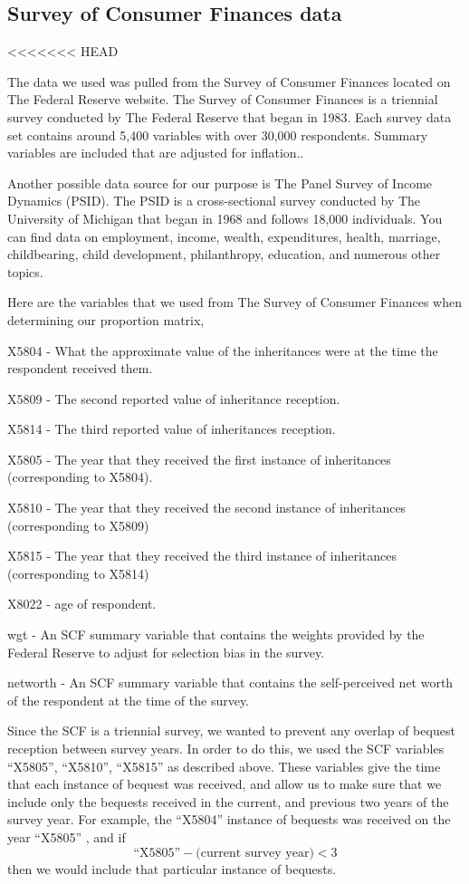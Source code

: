 \documentclass[letterpaper,12pt]{article}
\newcommand{\quotes}[1]{``#1''}
\theoremstyle{definition}
\begin{document}
\begin{spacing}{1.5}
\section{Survey of Consumer Finances data}\label{SecSCFdata}

<<<<<<< HEAD

The data we used was pulled from the Survey of Consumer Finances located on The Federal Reserve website. The Survey of Consumer Finances is a triennial survey conducted by The Federal Reserve that began in 1983. Each survey data set contains around 5,400 variables with over 30,000 respondents. Summary variables are included that are adjusted for inflation.\citet{FED}.

Another possible data source for our purpose is The Panel Survey of Income Dynamics (PSID). The PSID is a cross-sectional survey conducted by The University of Michigan that began in 1968 and follows 18,000 individuals. You can find data on employment, income, wealth, expenditures, health, marriage, childbearing, child development, philanthropy, education, and numerous other topics. \citet{UMich}

Here are the variables that we used from The Survey of Consumer Finances when determining our proportion matrix,

X5804 - What the approximate value of the inheritances were at the time the respondent received them. 

X5809 - The second reported value of inheritance reception.

X5814 - The third reported value of inheritances reception.

X5805 - The year that they received the first instance of inheritances (corresponding to X5804).

X5810 - The year that they received the second instance of inheritances (corresponding to X5809)

X5815 - The year that they received the third instance of inheritances (corresponding to X5814)

X8022 - age of respondent.

wgt - An SCF summary variable that contains the weights provided by the Federal Reserve to adjust for selection bias in the survey.

networth - An SCF summary variable that contains the self-perceived net worth of the respondent at the time of the survey. 


Since the SCF is a triennial survey, we wanted to prevent any overlap of bequest reception between survey years. In order to do this, we used the SCF variables \quotes{X5805}, \quotes{X5810}, \quotes{X5815} as described above. These variables give the time that each instance of bequest was received, and allow us to make sure that we include only the bequests received in the current, and previous two years of the survey year. For example, the \quotes{X5804} instance of bequests was received on the year \quotes{X5805} , and if 
\[\text{\quotes{X5805}} - \text{(current~survey~year)} <3\]
 then we would include that particular instance of bequests.


\end{spacing}
\end{document}
